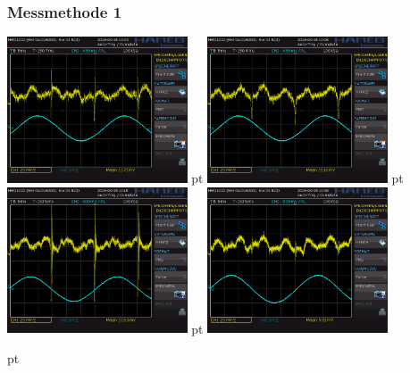 \documentclass[12pt]{article}
\begin{document}
\subsubsection{Messmethode 1}

\begin{minipage}[h!]{\textwidth}
	\centering
	\includegraphics[width=0.4\textwidth]{data/HHH01.PNG} pt
	\includegraphics[width=0.4\textwidth]{data/HHH02.PNG} pt
	\includegraphics[width=0.4\textwidth]{data/HHH03.PNG} pt
	\includegraphics[width=0.4\textwidth]{data/HHH04.PNG}
\end{minipage}
 pt
\end{document}

